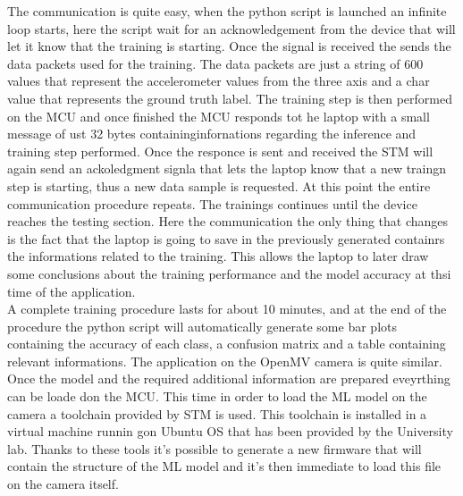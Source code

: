 \documentclass[12pt]{report}
\begin{document}
The communication is quite easy, when the python script is launched an infinite loop starts, here the script wait for an acknowledgement from the device that will let it know that the training is starting. Once the signal is received the sends the data packets used for the training. The data packets are just a string of 600 values that represent the accelerometer values from the three axis and a char value that represents the ground truth label. The training step is then performed on the MCU and once finished the MCU responds tot he laptop with a small message of ust 32 bytes containinginfornations regarding the inference and training step performed. Once the responce is sent and received the STM will again send an ackoledgment signla that lets the laptop know that a new traingn step is starting, thus a new data sample is requested. At this point the entire communication procedure repeats. 
The trainings continues until the device reaches the testing section. Here the communication the only thing that changes is the fact that the laptop is going to save in the previously generated containrs the informations related to the training. This allows the laptop to later draw some conclusions about the training performance and the model accuracy at thsi time of the application. \\
A complete training procedure lasts for about 10 minutes, and at the end of the procedure the python script will automatically generate some bar plots containing the accuracy of each class, a confusion matrix and a table containing relevant informations. \bigskip
The application on the OpenMV camera is quite similar. Once the model and the required additional information are prepared eveyrthing can be loade don the MCU. This time in order to load the ML model on the camera a toolchain provided by STM is used. This toolchain is installed in a virtual machine runnin gon Ubuntu OS that has been provided by the University lab. Thanks to these tools it's possible to generate a new firmware that will contain the structure of the ML model and it's then immediate to load this file on the camera itself.  \\
\end{document}
